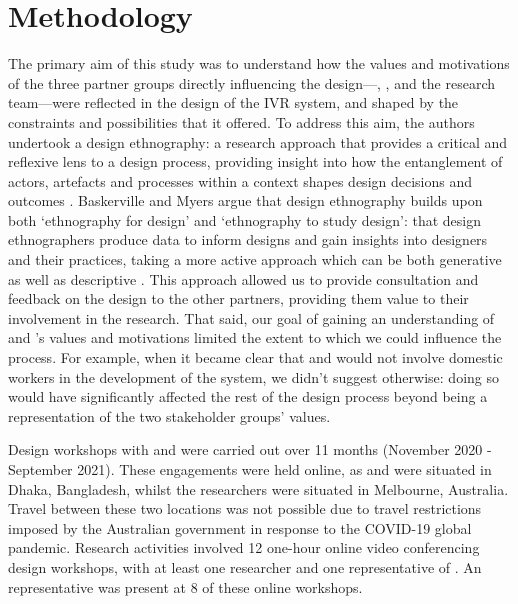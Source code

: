 \section{Methodology}

The primary aim of this study was to understand how the values and motivations of the three partner groups directly influencing the design---\NGO{}, \PC{}, and the research team---were reflected in the design of the IVR system, and shaped by the constraints and possibilities that it offered. To address this aim, the authors undertook a design ethnography: a research approach that provides a critical and reflexive lens to a design process, providing insight into how the entanglement of actors, artefacts and processes within a context shapes design decisions and outcomes \cite{akama2015, smith2016}. Baskerville and Myers argue that design ethnography builds upon both `ethnography for design' and `ethnography to study design': that design ethnographers produce data to inform designs and gain insights into designers and their practices, taking a more active approach which can be both generative as well as descriptive \cite{baskerville2015}. This approach allowed us to provide consultation and feedback on the design to the other partners, providing them value to their involvement in the research. That said, our goal of gaining an understanding of \PC{} and \NGO{}'s values and motivations limited the extent to which we could influence the process. For example, when it became clear that \PC{} and \NGO{} would not involve domestic workers in the development of the system, we didn't suggest otherwise: doing so would have significantly affected the rest of the design process beyond being a representation of the two stakeholder groups' values.

Design workshops with \PC{} and \NGO{} were carried out over 11 months (November 2020 - September 2021). These engagements were held online, as \PC{} and \NGO{} were situated in Dhaka, Bangladesh, whilst the researchers were situated in Melbourne, Australia. Travel between these two locations was not possible due to travel restrictions imposed by the Australian government in response to the COVID-19 global pandemic. Research activities involved 12 one-hour online video conferencing design workshops, with at least one researcher and one representative of \PC{}. An \NGO{} representative was present at 8 of these online workshops.

